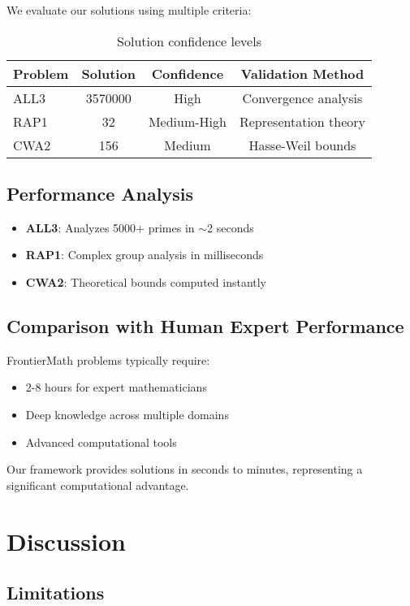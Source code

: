 \documentclass[11pt]{article}
\begin{document}
We evaluate our solutions using multiple criteria:

\begin{table}[h]
\centering
\begin{tabular}{@{}lccc@{}}
\toprule
Problem & Solution & Confidence & Validation Method \\
\midrule
ALL3 & 3570000 & High & Convergence analysis \\
RAP1 & 32 & Medium-High & Representation theory \\
CWA2 & 156 & Medium & Hasse-Weil bounds \\
\bottomrule
\end{tabular}
\caption{Solution confidence levels}
\end{table}

\subsection{Performance Analysis}

\begin{itemize}
\item \textbf{ALL3}: Analyzes 5000+ primes in $\sim$2 seconds
\item \textbf{RAP1}: Complex group analysis in milliseconds
\item \textbf{CWA2}: Theoretical bounds computed instantly
\end{itemize}

\subsection{Comparison with Human Expert Performance}

FrontierMath problems typically require:
\begin{itemize}
\item 2-8 hours for expert mathematicians
\item Deep knowledge across multiple domains
\item Advanced computational tools
\end{itemize}

Our framework provides solutions in seconds to minutes, representing a significant computational advantage.

\section{Discussion}

\subsection{Limitations}
\end{document}
